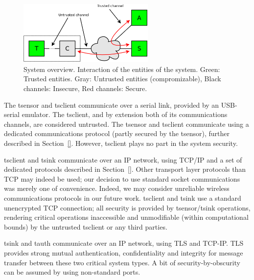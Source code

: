 \begin{figure}
\begin{center}
\includegraphics[width=0.6\textwidth]{figures/sys-overview.png} 
\end{center}
\caption{System overview. Interaction of the entities of the system. Green: Trusted entities. Gray: Untrusted entities (compromizable), Black channels: Insecure, Red channels: Secure.}
\label{fig:sys-overview}
\end{figure}


The tsensor and tsclient communicate over a serial link, provided by an USB-serial emulator. The tsclient, and by extension both of its communications channels, are considered untrusted. The tsensor and tsclient communicate using a dedicated communications protocol (partly secured by the tsensor), further described in Section~\ref{}. However, tsclient plays no part in the system security.

tsclient and tsink communicate over an IP network, using TCP/IP and a set of dedicated protocols described in Section~\ref{}. Other transport layer protocols than TCP may indeed be used; our decision to use standard socket communications was merely one of convenience. Indeed, we may consider unreliable wireless communications protocols in our future work. tsclient and tsink use a standard unencrypted TCP connection; all security is provided by tsensor/tsink operations, rendering critical operations inaccessible and unmodifiable (within computational bounds) by the untrusted tsclient or any third parties.

tsink and tauth communicate over an IP network, using TLS \cite{} and TCP-IP. TLS provides strong mutual authentication, confidentiality and integrity for message transfer between these two critical system types. A bit of security-by-obscurity can be assumed by using non-standard ports.  


